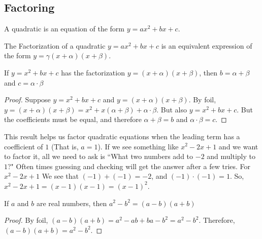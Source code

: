 \documentclass[crop=false,class=book,oneside]{standalone}
\begin{document}
        \subsection{Factoring}
            \begin{definition}
            A quadratic is an equation of the form $y=ax^{2}+bx+c$.
            \end{definition}
            \begin{definition}
            The Factorization of a quadratic $y=ax^{2}+bx+c$ is an equivalent expression of the form $y=\gamma(x+\alpha)(x+\beta)$.
            \end{definition}
            \begin{theorem}
            \label{theorem:north_shore_factorization_of_quadratic_when_a_is_equal_to_zero}
            If $y=x^{2}+bx+c$ has the factorization $y=(x+\alpha)(x+\beta)$, then $b=\alpha+\beta$ and $c=\alpha\cdot\beta$
            \end{theorem}
            \begin{proof}
            Suppose $y=x^{2}+bx+c$ and $y=(x+\alpha)(x+\beta)$. By \gls{foil}, $y=(x+\alpha)(x+\beta)=x^{2}+x(\alpha+\beta)+\alpha\cdot\beta$. But also $y=x^{2}+bx+c$. But the coefficients must be equal, and therefore $\alpha+\beta=b$ and $\alpha\cdot\beta=c$.
            \end{proof}
            \begin{remark}\label{remark:north_shore_example_of_using_factorization_when_a_equals_zero}
            This result helps us factor quadratic equations when the leading term has a coefficient of $1$ (That is, $a=1$). If we see something like $x^{2}-2x+1$ and we want to factor it, all we need to ask is ``What two numbers add to $-2$ and multiply to $1$?" Often times guessing and checking will get the answer after a few tries. For $x^{2}-2x+1$ We see that $(-1)+(-1)=-2$, and $(-1)\cdot (-1)=1$. So, $x^{2}-2x+1=(x-1)(x-1)=(x-1)^{2}$.
            \end{remark}
            \begin{theorem}
            \label{theorem:north_shore_difference_of_squares}
            If $a$ and $b$ are real numbers, then $a^{2}-b^{2}=(a-b)(a+b)$
            \end{theorem}
            \begin{proof}
            By \gls{foil}, $(a-b)(a+b)=a^{2}-ab+ba-b^{2}=a^{2}-b^{2}$. Therefore, $(a-b)(a+b)=a^{2}-b^{2}$.
            \end{proof}
\end{document}
